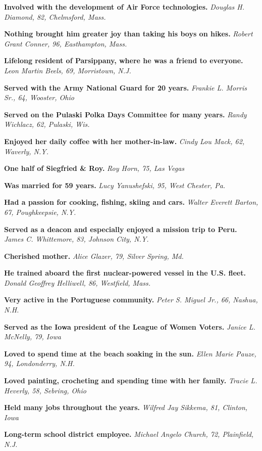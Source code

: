 \textbf{Involved with the development of Air Force technologies.}
\emph{Douglas H. Diamond, 82, Chelmsford, Mass.}

\textbf{Nothing brought him greater joy than taking his boys on hikes.}
\emph{Robert Grant Conner, 96, Easthampton, Mass.}

\textbf{Lifelong resident of Parsippany, where he was a friend to
everyone.} \emph{Leon Martin Beels, 69, Morristown, N.J.}

\textbf{Served with the Army National Guard for 20 years.} \emph{Frankie
L. Morris Sr., 64, Wooster, Ohio}

\textbf{Served on the Pulaski Polka Days Committee for many years.}
\emph{Randy Wichlacz, 62, Pulaski, Wis.}

\textbf{Enjoyed her daily coffee with her mother-in-law.} \emph{Cindy
Lou Mack, 62, Waverly, N.Y.}

\textbf{One half of Siegfried \& Roy.} \emph{Roy Horn, 75, Las Vegas}

\textbf{Was married for 59 years.} \emph{Lucy Yanushefski, 95, West
Chester, Pa.}

\textbf{Had a passion for cooking, fishing, skiing and cars.}
\emph{Walter Everett Barton, 67, Poughkeepsie, N.Y.}

\textbf{Served as a deacon and especially enjoyed a mission trip to
Peru.} \emph{James C. Whittemore, 83, Johnson City, N.Y.}

\textbf{Cherished mother.} \emph{Alice Glazer, 79, Silver Spring, Md.}

\textbf{He trained aboard the first nuclear-powered vessel in the U.S.
fleet.} \emph{Donald Geoffrey Helliwell, 86, Westfield, Mass.}

\textbf{Very active in the Portuguese community.} \emph{Peter S. Miguel
Jr., 66, Nashua, N.H.}

\textbf{Served as the Iowa president of the League of Women Voters.}
\emph{Janice L. McNelly, 79, Iowa}

\textbf{Loved to spend time at the beach soaking in the sun.}
\emph{Ellen Marie Pauze, 94, Londonderry, N.H.}

\textbf{Loved painting, crocheting and spending time with her family.}
\emph{Tracie L. Heverly, 58, Sebring, Ohio}

\textbf{Held many jobs throughout the years.} \emph{Wilfred Jay Sikkema,
81, Clinton, Iowa}

\textbf{Long-term school district employee.} \emph{Michael Angelo
Church, 72, Plainfield, N.J.}

